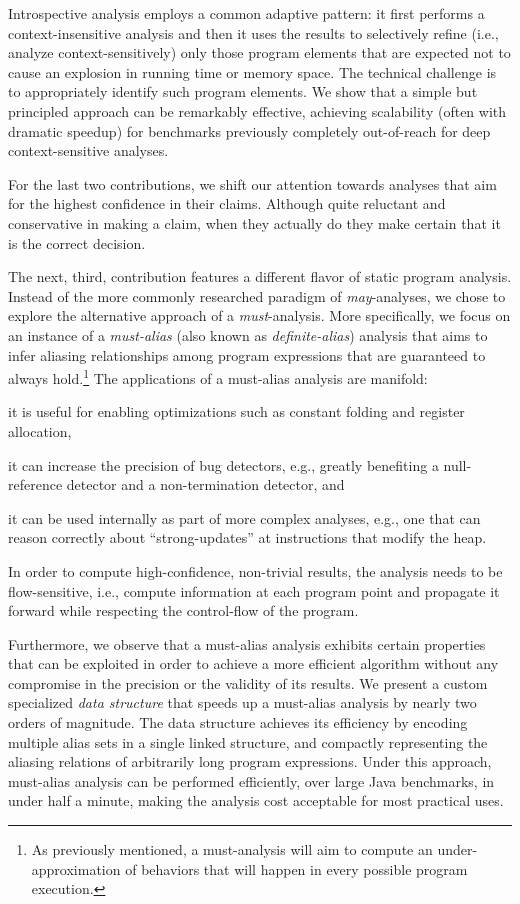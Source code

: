 Introspective analysis employs a common adaptive pattern: it first performs a context-insensitive analysis and then it uses the results to selectively refine (i.e., analyze context-sensitively) only those program elements that are expected not to cause an explosion in running time or memory space. The technical challenge is to appropriately identify such program elements. We show that a simple but principled approach can be remarkably effective, achieving scalability (often with dramatic speedup) for benchmarks previously completely out-of-reach for deep context-sensitive analyses.

For the last two contributions, we shift our attention towards analyses that aim for the highest confidence in their claims. Although quite reluctant and conservative in making a claim, when they actually do they make certain that it is the correct decision.

 The next, third, contribution features a different flavor of static program analysis. Instead of the more commonly researched paradigm of \emph{may}-analyses, we chose to explore the alternative approach of a \emph{must}-analysis. More specifically, we focus on an instance of a \emph{must-alias} (also known as \emph{definite-alias}) analysis that aims to infer aliasing relationships among program expressions that are guaranteed to always hold.\footnote{As previously mentioned, a must-analysis will aim to compute an under-approximation of behaviors that will happen in every possible program execution.} The applications of a must-alias analysis are manifold:
\begin{inparaenum}[(1)]
\item it is useful for enabling optimizations such as constant folding and register allocation,
\item it can increase the precision of bug detectors, e.g., greatly benefiting a null-reference detector and a non-termination detector, and
\item it can be used internally as part of more complex analyses, e.g., one that can reason correctly about ``strong-updates'' at instructions that modify the heap.
\end{inparaenum}
In order to compute high-confidence, non-trivial results, the analysis needs to be flow-sensitive, i.e., compute information at each program point and propagate it forward while respecting the control-flow of the program.

Furthermore, we observe that a must-alias analysis exhibits certain properties that can be exploited in order to achieve a more efficient algorithm without any compromise in the precision or the validity of its results. We present a custom specialized \emph{data structure} that speeds up a must-alias analysis by nearly two orders of magnitude. The data structure achieves its efficiency by encoding multiple alias sets in a single linked structure, and compactly representing the aliasing relations of arbitrarily long program expressions. Under this approach, must-alias analysis can be performed efficiently, over large Java benchmarks, in under half a minute, making the analysis cost acceptable for most practical uses.

